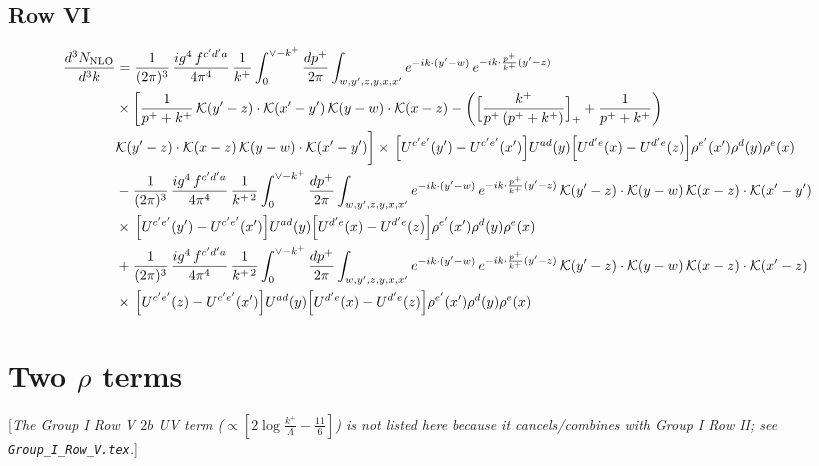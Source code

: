 \documentclass[9pt]{article}
\newcommand{\rnote}[1]{{\color{teal}[\textit{#1}]}}
\numberwithin{equation}{section}
\begin{document}
\subsection{Row VI}
\begin{align}
\frac{d^{3}N_{\rm NLO}}{d^{3}k}&=\frac{1}{(2\pi)^{3}}\,\frac{ig^{4}\,f^{c^{\prime}d^{\prime}a}}{4\pi^{4}}\,\frac{1}{k^{+}}\int_{0}^{\vee-k^{+}}\frac{dp^{+}}{2\pi}\int_{w,y^{\prime},z,y,x,x^{\prime}}e^{-ik\cdot(y^{\prime}-w)}\,e^{-ik\cdot\frac{p^{+}}{k^{+}}(y^{\prime}-z)}\notag\\&\times\bigg[\frac{1}{p^{+}+k^{+}}\,\mathcal{K}(y^{\prime}-z)\cdot\mathcal{K}(x^{\prime}-y^{\prime})\,\mathcal{K}(y-w)\cdot\mathcal{K}(x-z)-\bigg(\Big[\frac{k^{+}}{p^{+}\,(p^{+}+k^{+})}\Big]_{+}+\frac{1}{p^{+}+k^{+}}\bigg)\notag \\ & \mathcal{K}(y^{\prime}-z)\cdot\mathcal{K}(x-z)\,\mathcal{K}(y-w)\cdot\mathcal{K}(x^{\prime}-y^{\prime})\bigg]\times\,\Big[U^{c^{\prime}e^{\prime}}(y^{\prime})-U^{c^{\prime}e^{\prime}}(x^{\prime})\Big]U^{ad}(y)\Big[U^{d^{\prime}e}(x)-U^{d^{\prime}e}(z)\Big]\rho^{e^{\prime}}(x^{\prime})\rho^{d}(y)\rho^{e}(x)\notag\\&-\frac{1}{(2\pi)^{3}}\,\frac{ig^{4}\,f^{c^{\prime}d^{\prime}a}}{4\pi^{4}}\,\frac{1}{k^{+\,2}}\int_{0}^{\vee-k^{+}}\frac{dp^{+}}{2\pi}\int_{w,y^{\prime},z,y,x,x^{\prime}}e^{-ik\cdot(y^{\prime}-w)}\,e^{-ik\cdot\frac{p^{+}}{k^{+}}(y^{\prime}-z)}\,\mathcal{K}(y^{\prime}-z)\cdot\mathcal{K}(y-w)\,\mathcal{K}(x-z)\cdot\mathcal{K}(x^{\prime}-y^{\prime})\notag\\&\times\,\Big[U^{c^{\prime}e^{\prime}}(y^{\prime})-U^{c^{\prime}e^{\prime}}(x^{\prime})\Big]U^{ad}(y)\Big[U^{d^{\prime}e}(x)-U^{d^{\prime}e}(z)\Big]\rho^{e^{\prime}}(x^{\prime})\rho^{d}(y)\rho^{e}(x)\notag\\&+\frac{1}{(2\pi)^{3}}\,\frac{ig^{4}\,f^{c^{\prime}d^{\prime}a}}{4\pi^{4}}\,\frac{1}{k^{+\,2}}\int_{0}^{\vee-k^{+}}\frac{dp^{+}}{2\pi}\int_{w,y^{\prime},z,y,x,x^{\prime}}e^{-ik\cdot(y^{\prime}-w)}\,e^{-ik\cdot\frac{p^{+}}{k^{+}}(y^{\prime}-z)}\,\mathcal{K}(y^{\prime}-z)\cdot\mathcal{K}(y-w)\,\mathcal{K}(x-z)\cdot\mathcal{K}(x^{\prime}-z)\notag\\&\times\,\Big[U^{c^{\prime}e^{\prime}}(z)-U^{c^{\prime}e^{\prime}}(x^{\prime})\Big]U^{ad}(y)\Big[U^{d^{\prime}e}(x)-U^{d^{\prime}e}(z)\Big]\rho^{e^{\prime}}(x^{\prime})\rho^{d}(y)\rho^{e}(x)
\end{align}
\section*{Two $\rho$ terms}
\rnote{The Group I Row V $2b$ UV term ($\propto[2\log\frac{k^{+}}{\Lambda}-\frac{11}{6}]$) is not listed here because it cancels/combines with Group I Row II; see \texttt{Group\_I\_Row\_V.tex}.}
\end{document}
